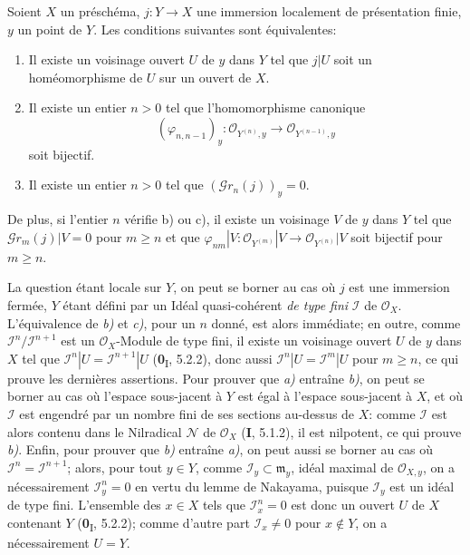 \begin{proposition}[16.1.9]
\label{IV.16.1.9}
Soient $X$ un préschéma, $j:Y\to X$ une immersion localement de présentation
finie, $y$ un point de $Y$. Les conditions suivantes sont équivalentes:
\begin{enumerate}
\item[\textup{a)}] Il existe un voisinage ouvert $U$ de $y$ dans $Y$ tel que $j|U$ soit
un homéomorphisme de $U$ sur un ouvert de $X$.
\item[\textup{b)}] Il existe un entier $n>0$ tel que l'homomorphisme canonique
\[
  (\varphi_{n,n-1})_y:
  \mathcal{O}_{Y^{(n)},y}\longrightarrow\mathcal{O}_{Y^{(n-1)},y}
\]
soit bijectif.
\item[\textup{c)}] Il existe un entier $n>0$ tel que
$(\mathscr{G}r_n(j))_y=0$.
\end{enumerate}

De plus, si l'entier $n$ vérifie \textup{b)} ou \textup{c)}, il existe un voisinage $V$ de $y$
dans $Y$ tel que $\mathscr{G}r_m(j)|V=0$ pour $m\geq n$ et que
$\varphi_{nm}|V:\mathcal{O}_{Y^{(m)}}|V\to\mathcal{O}_{Y^{(n)}}|V$ soit
bijectif pour $m\geq n$.
\end{proposition}

La question étant locale sur $Y$, on peut se borner au cas où $j$ est une
immersion fermée, $Y$ étant défini par un Idéal quasi-cohérent \emph{de type fini}
$\mathscr{I}$ de $\mathcal{O}_X$. L'équivalence de \emph{b)} et \emph{c)}, pour un $n$ donné,
est alors immédiate; en outre, comme
$\mathscr{I}^n/\mathscr{I}^{n+1}$ est un $\mathcal{O}_X$-Module de type fini,
il existe un voisinage ouvert $U$ de $y$ dans $X$ tel que
$\mathscr{I}^n|U=\mathscr{I}^{n+1}|U$ (\textbf{0}\textsubscript{I}, 5.2.2), donc aussi
$\mathscr{I}^n|U=\mathscr{I}^m|U$ pour $m\geq n$, ce qui prouve les dernières
assertions. Pour prouver que \emph{a)} entraîne \emph{b)}, on peut se borner au cas où
l'espace sous-jacent à $Y$ est égal à l'espace sous-jacent à $X$, et où
$\mathscr{I}$ est engendré par un nombre fini de ses sections au-dessus de $X$:
comme $\mathscr{I}$ est alors contenu dans le Nilradical $\mathscr{N}$ de
$\mathcal{O}_X$ (\textbf{I}, 5.1.2), il est nilpotent, ce qui prouve \emph{b)}. Enfin, pour
prouver que \emph{b)} entraîne \emph{a)}, on peut aussi se borner au cas où
$\mathscr{I}^n=\mathscr{I}^{n+1}$; alors, pour tout $y\in Y$, comme
$\mathscr{I}_y\subset\mathfrak{m}_y$, idéal maximal de
$\mathcal{O}_{X,y}$, on a nécessairement $\mathscr{I}_y^n=0$ en vertu du
lemme de Nakayama, puisque $\mathscr{I}_y$ est un idéal de type fini.
L'ensemble des $x\in X$ tels que $\mathscr{I}_x^n=0$ est donc un ouvert $U$ de
$X$ contenant $Y$ (\textbf{0}\textsubscript{I}, 5.2.2); comme d'autre part
$\mathscr{I}_x\neq 0$ pour $x\notin Y$, on a nécessairement $U=Y$.

